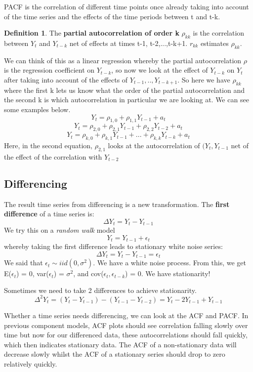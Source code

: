 \documentclass[11pt, oneside]{article}
\theoremstyle{definition}
\newtheorem{definition}{Definition}[section]
\begin{document}
PACF is the correlation of different time points once already taking into account of the time series and the effects of the time periods between t and t-k.
\begin{definition}
  The \textbf{partial autocorrelation of order k} $\rho_{kk}$ is the correlation between $Y_t$ and $Y_{t-k}$ net of effects at times t-1, t-2,...,t-k+1. $r_{kk}$ estimates $\rho_{kk}$.
\end{definition}

We can think of this as a linear regression whereby the partial autocorrelation $\rho$ is the regression coefficient on $Y_{t-k}$, so now we look at the effect of $Y_{t-k}$ on $Y_t$ after taking into account of the effects of $Y_{t-1},..,Y_{t-k+1}$. So here we have $\rho_{kk}$ where the first k lets us know what the order of the partial autocorrelation and the second k is which autocorrelation in particular we are looking at. We can see some examples below.
$$
Y_t = \rho_{1,0} + \rho_{1,1}Y_{t-1} + a_t
$$
$$
Y_t = \rho_{2,0} + \rho_{2,1}Y_{t-1} + \rho_{2,2}Y_{t-2} + a_t
$$
$$
Y_t = \rho_{k,0} + \rho_{k,1}Y_{t-1} + ... + \rho_{k,k}Y_{t-k} + a_t
$$
Here, in the second equation, $\rho_{2,1}$ looks at the autocorrelation of $(Y_t, Y_{t-1}$ net of the effect of the correlation with $Y_{t-2}$

\subsection{Differencing}
The result time series from differencing is a new transformation. The \textbf{first difference} of a time series is:
$$
\Delta Y_t = Y_t - Y_{t-1}
$$
 We try this on a \textit{random walk} model
$$
Y_t = Y_{t-1} + \epsilon_t
$$
whereby taking the first difference leads to stationary white noise series:
$$
\Delta Y_t = Y_t - Y_{t-1} = \epsilon_t
$$
 We said that $\epsilon_t \sim iid(0, \sigma^2)$. We have a white noise process. From this, we get E($\epsilon_t$) = 0, var($\epsilon_t$) = $\sigma^2$, and cov($\epsilon_t, \epsilon_{t-k}$) = 0. We have stationarity!

 Sometimes we need to take 2 differences to achieve stationarity.
 $$
\Delta^2 Y_t = (Y_t - Y_{t-1}) - (Y_{t-1} - Y_{t-2}) = Y_t - 2Y_{t-1} + Y_{t-1}
 $$

 Whether a time series needs differencing, we can look at the ACF and PACF. In previous component models, ACF plots should see correlation falling slowly over time but now for our differenced data, these autocorrelations should fall quickly, which then indicates stationary data. The ACF of a non-stationary data will decrease slowly whilst the ACF of a stationary series should drop to zero relatively quickly.
\end{document}
